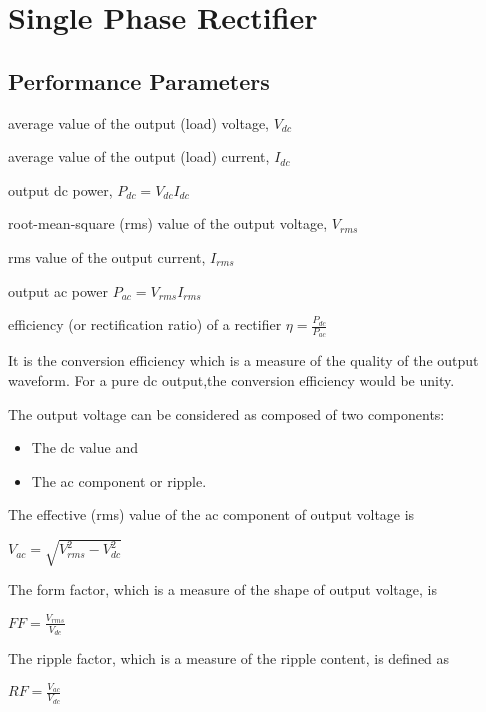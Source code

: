 \section{Single Phase Rectifier}

\subsection{Performance Parameters} 
    
    average value of the output (load) voltage, \(V_{dc}\)
    
    average value of the output (load) current, \(I_{dc}\)
    
    output dc power, 
    \(P_{dc} = V_{dc} I_{dc} \)
    
    root-mean-square (rms) value of the output voltage, \(V_{rms} \)
    
    rms value of the output current, \(I_{rms}\)
    
    output ac power \(P_{ac} = V_{rms} I_{rms} \)
    
    efficiency (or rectification ratio) of a rectifier \( \eta =  \frac{P_{dc}}{P_{ac}}\) 

It is the conversion efficiency which is a measure of the quality of the output waveform. For a pure dc output,the conversion efficiency would be unity.

The output voltage can be considered as composed of two components: 
\begin{itemize}
    \item The dc value and 
    \item The ac component or ripple.
\end{itemize}

The effective (rms) value of the ac component of output voltage is

\begin{center}
    \(V_{ac} = \sqrt{V_{rms}^2 - V_{dc}^2}\)
\end{center}

The form factor, which is a measure of the shape of output voltage, is

\begin{center}
\(FF = \frac{V_{rms}}{V_{dc}} \)    
\end{center}

The ripple factor, which is a measure of the ripple content, is defined as

\begin{center}
    \(RF = \frac{V_{ac}}{V_{dc}}\)
\end{center}

